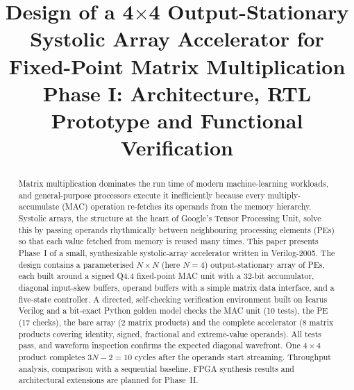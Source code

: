 \documentclass[conference]{IEEEtran}
\begin{document}
\title{Design of a 4$\times$4 Output-Stationary Systolic Array Accelerator for Fixed-Point Matrix Multiplication\\
\large Phase I: Architecture, RTL Prototype and Functional Verification}

\author{
\IEEEauthorblockA{[2401010185]}
\and
{}
\IEEEauthorblockA{[2401010181]}
\and
{}
\IEEEauthorblockA{[2401010014]}
\and
{}
\IEEEauthorblockA{[2401010432]}
\and
{}
\IEEEauthorblockA{[2401020109]}
\and
{}
}

\maketitle

\begin{abstract}
Matrix multiplication dominates the run time of modern machine-learning
workloads, and general-purpose processors execute it inefficiently because
every multiply-accumulate (MAC) operation re-fetches its operands from the
memory hierarchy. Systolic arrays, the structure at the heart of Google's
Tensor Processing Unit, solve this by passing operands rhythmically between
neighbouring processing elements (PEs) so that each value fetched from memory
is reused many times. This paper presents Phase~I of a small,
synthesizable systolic-array accelerator written in Verilog-2005. The design
contains a parameterised $N\times N$ (here $N=4$) output-stationary array of
PEs, each built around a signed Q4.4 fixed-point MAC unit with a 32-bit
accumulator, diagonal input-skew buffers, operand buffers with a simple
matrix data interface, and a five-state controller. A
directed, self-checking verification environment built on Icarus Verilog
and a bit-exact Python golden model checks the MAC unit (10 tests), the PE
(17 checks), the bare array (2 matrix products) and the complete
accelerator (8 matrix products covering identity, signed, fractional and
extreme-value operands). All tests pass, and waveform inspection confirms
the expected diagonal wavefront. One $4\times4$ product completes $3N-2=10$
cycles after the operands start streaming. Throughput analysis, comparison
with a sequential baseline, FPGA synthesis results and architectural
extensions are planned for Phase~II.
\end{abstract}
\end{document}
